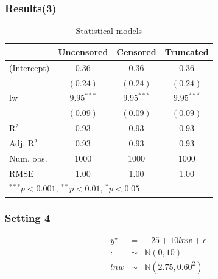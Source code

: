\documentclass{beamer}
\newcommand{\1}{\mathbb{1}}
\newcommand{\N}{\mathbb{N}}
\begin{document}
\begin{frame}\frametitle{Results(3)}
\tiny
\begin{table}
\begin{center}
\begin{tabular}{l c c c }
\hline
 & Uncensored & Censored & Truncated \\
\hline
(Intercept) & $0.36$       & $0.36$       & $0.36$       \\
            & $(0.24)$     & $(0.24)$     & $(0.24)$     \\
lw          & $9.95^{***}$ & $9.95^{***}$ & $9.95^{***}$             \\
            & $(0.09)$     & $(0.09)$     & $(0.09)$             \\
\hline
R$^2$       & 0.93         & 0.93         & 0.93         \\
Adj. R$^2$  & 0.93         & 0.93         & 0.93         \\
Num. obs.   & 1000         & 1000         & 1000         \\
RMSE        & 1.00         & 1.00         & 1.00         \\
\hline
\multicolumn{4}{l}{\scriptsize{$^{***}p<0.001$, $^{**}p<0.01$, $^*p<0.05$}}
\end{tabular}
\caption{Statistical models}
\label{table:coefficients}
\end{center}
\end{table}
\end{frame}

\begin{frame}\frametitle{Setting 4}
\begin{eqnarray}
y^{\star} &=& -25 + 10 lnw + \epsilon\\
\epsilon &\sim& \N(0,10)\\
lnw &\sim& \N(2.75,0.60^2)
\end{eqnarray}
\end{frame}
\end{document}
